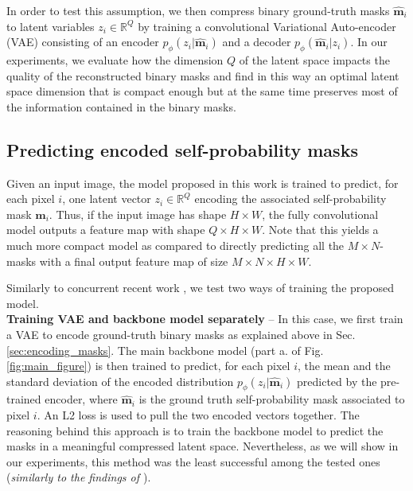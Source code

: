 In order to test this assumption, we then compress binary ground-truth masks $\hat{\mathbf{m}}_i$ to latent variables $z_i\in \mathbb{R}^Q$ by training a convolutional Variational Auto-encoder (VAE) \cite{kingma2013auto,rezende2014stochastic} consisting of an encoder $p_{\phi}(z_i|\hat{\mathbf{m}}_i)$ and a decoder $p_{\phi}(\hat{\mathbf{m}}_i|z_i)$.
In our experiments, we evaluate how the dimension $Q$ of the latent space impacts the quality of the reconstructed binary masks and find in this way an optimal latent space dimension that is compact enough but at the same time preserves most of the information contained in the binary masks.

\subsection{Predicting encoded self-probability masks} \label{sec:model_and_loss}
Given an input image, the model proposed in this work is trained to predict, for each pixel $i$, one latent vector $z_i\in \mathbb{R}^Q$ encoding the associated self-probability mask $\mathbf{m}_i$. Thus, if the input image has shape $H\times W$, the fully convolutional model outputs a feature map with shape $Q\times H\times W$. 
Note that this yields a much more compact model as compared to directly predicting all the $M\times N$-masks with a final output feature map of size $M\times N\times H\times W$.

Similarly to concurrent recent work \cite{hirsch2020patchperpix}, we test two ways of training the proposed model. \\

\textbf{Training VAE and backbone model separately} -- In this case, we first train a VAE to encode ground-truth binary masks as explained above in Sec. \ref{sec:encoding_masks}. 
The main backbone model (part a. of Fig. \ref{fig:main_figure}) is then trained to predict, for each pixel $i$, the mean and the standard deviation of the encoded distribution $p_{\phi}(z_i|\hat{\mathbf{m}}_i)$ predicted by the pre-trained encoder, where $\hat{\mathbf{m}}_i$ is the ground truth self-probability mask associated to pixel $i$. An L2 loss is used to pull the two encoded vectors together. 
The reasoning behind this approach is to train the backbone model to predict the masks in a meaningful compressed latent space. 
Nevertheless, as we will show in our experiments, this method was the least successful among the tested ones (\emph{similarly to the findings of \cite{hirsch2020patchperpix}}).\\


